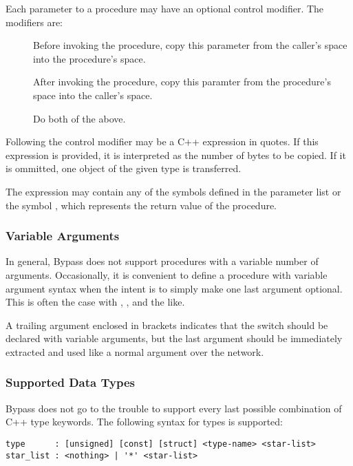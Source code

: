 Each parameter to a procedure may have an optional control modifier.  The modifiers are:
\begin{description}
\item[] Before invoking the procedure, copy this parameter from the caller's space into the procedure's space.
\item[] After invoking the procedure, copy this paramter from the procedure's space into the caller's space.
\item[] Do both of the above.
\end{description}

Following the control modifier may be a C++ expression in quotes.  If this expression is provided, it is interpreted as the number of bytes to be copied.  If it is ommitted, one object of the given type is transferred.

The expression may contain any of the symbols defined in the parameter list or the symbol , which represents the return value of the procedure.

\subsubsection{Variable Arguments}

In general, Bypass does not support procedures with a variable number of arguments.  Occasionally, it is convenient to define a procedure with variable argument syntax when the intent is to simply make one last argument optional.  This is often the case with , , and the like.

A trailing argument enclosed in brackets indicates that the switch should be declared with variable arguments, but the last argument should be immediately extracted and used like a normal argument over the network.

\subsubsection{Supported Data Types}

Bypass does not go to the trouble to support every last possible combination of C++ type keywords.  The following syntax for types is supported:

\begin{verbatim}
type      : [unsigned] [const] [struct] <type-name> <star-list>
star_list : <nothing> | '*' <star-list>
\end{verbatim}

